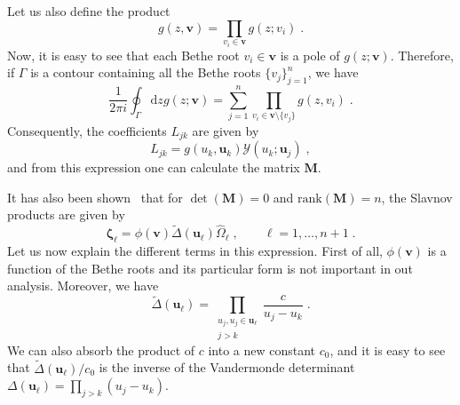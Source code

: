\documentclass[a4paper,12pt]{amsart}
\begin{document}
Let us also define the product 
\begin{equation}
  g(z, \bm{v}) = \prod_{v_i\in \bm{v}} g(z; v_i)\; . 
\end{equation}
Now, it is easy to see that each Bethe root \( v_i \in \bm{v}\) is a
pole of \(g(z;\bm{v})\). Therefore, if \(\Gamma\) is a contour
containing all the Bethe roots \(\{v_j\}_{j=1}^n\), we have
\begin{equation}
  \frac{1}{2 \pi i}\oint_{\Gamma} \mathrm{d}z g(z; \bm{v}) = \sum_{j=1}^n
  \prod_{v_i \in \bm{v}\setminus \{v_j\}} g(z, v_i)\; .
\end{equation}
Consequently, the coefficients \(L_{jk}\) are given by
\begin{equation}
  L_{jk} = g(u_k, \bm{u}_k) \mathcal{Y}(u_k; \bm{u}_j)\; ,
\end{equation}
and from this expression one can calculate the matrix \(\bm{M}\).

It has also been shown~\cite{Belliard:2019bfz} that for \(\det(\bm{M})
= 0\) and \(\mathrm{rank}(\bm{M}) = n\), the Slavnov products are
given by
\begin{equation}
 \bm{\zeta}_\ell = \phi(\bm{v}) \tilde{\Delta}(\bm{u}_\ell)\hat{\Omega}_\ell\; , \qquad \ell = 1, \dots, n+1\; .
\end{equation}
Let us now explain the different terms in this expression.  First of
all, \(\phi(\bm{v})\) is a function of the Bethe roots and its
particular form is not important in out analysis. Moreover, we have
\begin{equation}
  \tilde{\Delta}(\bm{u}_\ell) = \prod_{\substack{u_j, u_j \in \bm{u}_\ell \\ j>k}} \frac{c}{u_j - u_k}\; .
\end{equation}
We can also absorb the product of \(c\) into a new constant
\(c_0\), and it is easy to see that \(\tilde{\Delta}(\bm{u}_\ell)/c_0\) is the
inverse of the Vandermonde determinant \(\Delta(\bm{u}_\ell) =
\prod_{j>k}(u_j - u_k)\).
\end{document}
